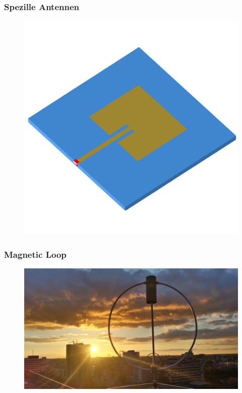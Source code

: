 \begin{frame}
  \frametitle{Spezille Antennen}
  \begin{center}
    \begin{figure}
      \includegraphics[width=1\textwidth,height=.75\textheight,keepaspectratio]{a09/patch.png}
    \end{figure}
  \end{center}
\end{frame}

\begin{frame}
  \frametitle{Magnetic Loop}
  \begin{center}
    \begin{figure}
      \includegraphics[width=1\textwidth,height=.75\textheight,keepaspectratio]{a09/Magloop.jpg}
    \end{figure}
  \end{center}
\end{frame}

